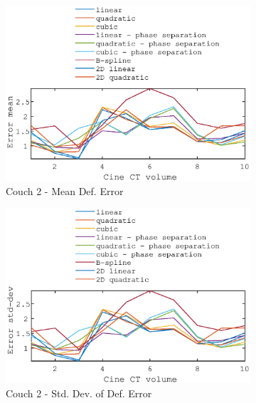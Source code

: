 \documentclass[11pt,a4paper,oneside]{report}
\begin{document}
\begin{figure}[H]
\begin{subfigure}[b]{0.5\textwidth}
    \includegraphics[width=\textwidth, trim=0 0 0 \trimval,clip=true]{figures/task4/def_mean_error_couch2.eps}
    \caption{Couch 2 - Mean Def. Error}
  \end{subfigure}%
  \begin{subfigure}[b]{0.5\textwidth}
    \includegraphics[width=\textwidth, trim=0 0 0 \trimval,clip=true]{figures/task4/def_stddev_error_couch2.eps}
    \caption{Couch 2 - Std. Dev. of Def. Error}
  \end{subfigure}
  ~
    \hspace*{-2em}
  \begin{subfigure}[b]{0.5\textwidth}

\end{subfigure}
\end{figure}
\end{document}
